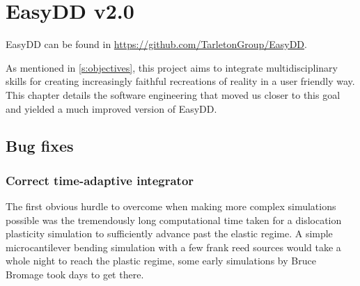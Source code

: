 \chapter{EasyDD v2.0}
\label{c:easydd}

EasyDD can be found in \href{https://github.com/TarletonGroup/EasyDD}{https://github.com/TarletonGroup/EasyDD}.

As mentioned in \cref{s:objectives}, this project aims to integrate multidisciplinary skills for creating increasingly faithful recreations of reality in a user friendly way. This chapter details the software engineering that moved us closer to this goal and yielded a much improved version of EasyDD.

\section{Bug fixes}
\label{s:bugs}

\subsection{Correct time-adaptive integrator}
\label{ss:integrator}

The first obvious hurdle to overcome when making more complex simulations possible was the tremendously long computational time taken for a dislocation plasticity simulation to sufficiently advance past the elastic regime. A simple microcantilever bending simulation with a few frank reed sources would take a whole night to reach the plastic regime, some early simulations by Bruce Bromage took days to get there.

